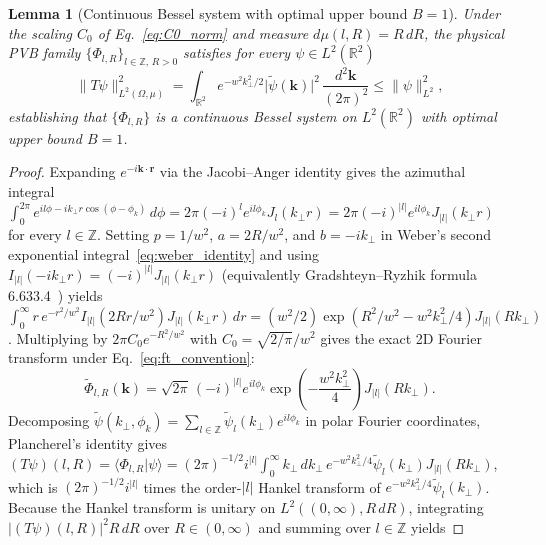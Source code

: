 \documentclass[aps,pra,reprint,nofootinbib,floatfix,longbibliography]{revtex4-2}
\newtheorem{lemma}{Lemma}
\theoremstyle{remark}
\newcommand{\braket}[2]{\langle #1 | #2 \rangle}
\newcommand{\norm}[1]{\lVert #1 \rVert}
\newcommand{\abs}[1]{\lvert #1 \rvert}
\begin{document}
\begin{lemma}[Continuous Bessel system with optimal upper bound $B=1$]
\label{lem:bessel_upper}
Under the scaling $C_0$ of Eq.~\eqref{eq:C0_norm} and measure $d\mu(l,R) = R\,dR$, the physical PVB family $\{\Phi_{l,R}\}_{l\in\mathbb{Z},\,R>0}$ satisfies for every $\psi \in L^2(\mathbb{R}^2)$
\begin{equation}
\norm{T\psi}_{L^2(\Omega,\mu)}^2 = \int_{\mathbb{R}^2} e^{-w^2 k_\perp^2/2}\abs{\widetilde{\psi}(\mathbf{k})}^2\,\frac{d^2\mathbf{k}}{(2\pi)^2} \le \norm{\psi}_{L^2}^2,
\label{eq:bessel_lemma}
\end{equation}
establishing that $\{\Phi_{l,R}\}$ is a continuous Bessel system on $L^2(\mathbb{R}^2)$ with optimal upper bound $B = 1$.
\end{lemma}
\begin{proof}
Expanding $e^{-i\mathbf{k}\cdot\mathbf{r}}$ via the Jacobi--Anger identity gives the azimuthal integral $\int_0^{2\pi} e^{il\phi - ik_\perp r\cos(\phi-\phi_k)}\,d\phi = 2\pi (-i)^l e^{il\phi_k} J_l(k_\perp r) = 2\pi (-i)^{\abs{l}} e^{il\phi_k} J_{\abs{l}}(k_\perp r)$ for every $l \in \mathbb{Z}$. Setting $p = 1/w^2$, $a = 2R/w^2$, and $b = -i k_\perp$ in Weber's second exponential integral~\eqref{eq:weber_identity} and using $I_{\abs{l}}(-i k_\perp r) = (-i)^{\abs{l}} J_{\abs{l}}(k_\perp r)$ (equivalently Gradshteyn--Ryzhik formula 6.633.4~\cite{Gradshteyn2014}) yields $\int_0^\infty r\,e^{-r^2/w^2} I_{\abs{l}}(2Rr/w^2) J_{\abs{l}}(k_\perp r)\,dr = (w^2/2)\exp(R^2/w^2 - w^2 k_\perp^2/4) J_{\abs{l}}(R k_\perp)$. Multiplying by $2\pi C_0 e^{-R^2/w^2}$ with $C_0 = \sqrt{2/\pi}/w^2$ gives the exact 2D Fourier transform under Eq.~\eqref{eq:ft_convention}:
\begin{equation}
\widetilde{\Phi}_{l,R}(\mathbf{k}) = \sqrt{2\pi}\,(-i)^{\abs{l}} e^{il\phi_k} \exp\!\left(-\frac{w^2 k_\perp^2}{4}\right) J_{\abs{l}}(R k_\perp).
\label{eq:pvb_ft}
\end{equation}
Decomposing $\widetilde{\psi}(k_\perp,\phi_k) = \sum_{l\in\mathbb{Z}} \widetilde{\psi}_l(k_\perp)e^{il\phi_k}$ in polar Fourier coordinates, Plancherel's identity gives $(T\psi)(l,R) = \braket{\Phi_{l,R}}{\psi} = (2\pi)^{-1/2} i^{\abs{l}} \allowbreak \int_0^\infty k_\perp\,dk_\perp\, \allowbreak e^{-w^2 k_\perp^2/4}\widetilde{\psi}_l(k_\perp) J_{\abs{l}}(Rk_\perp)$, which is $(2\pi)^{-1/2} i^{\abs{l}}$ times the order-$\abs{l}$ Hankel transform of $e^{-w^2 k_\perp^2/4}\widetilde{\psi}_l(k_\perp)$. Because the Hankel transform is unitary on $L^2((0,\infty), R\,dR)$, integrating $\abs{(T\psi)(l,R)}^2 R\,dR$ over $R \in (0,\infty)$ and summing over $l \in \mathbb{Z}$ yields

\end{proof}
\end{document}
